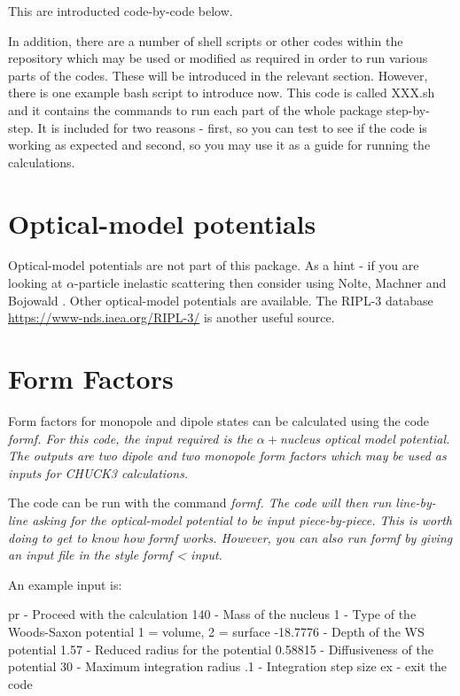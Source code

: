 \documentclass[a4paper,10pt]{article}
\begin{document}
This are introducted code-by-code below.

In addition, there are a number of shell scripts or other codes within the repository which may be used or modified as required in order to run various parts of the codes. These will be introduced in the relevant section. However, there is one example bash script to introduce now. This code is called XXX.sh and it contains the commands to run each part of the whole package step-by-step. It is included for two reasons - first, so you can test to see if the code is working as expected and second, so you may use it as a guide for running the calculations.

\section{Optical-model potentials}

Optical-model potentials are not part of this package. As a hint - if you are looking at $\alpha$-particle inelastic scattering then consider using Nolte, Machner and Bojowald \cite{NMBAlphaPotentials}. Other optical-model potentials are available. The RIPL-3 database \url{https://www-nds.iaea.org/RIPL-3/} is another useful source.

\section{Form Factors}

Form factors for monopole and dipole states can be calculated using the code \it{formf}. For this code, the input required is the $\alpha+$nucleus optical model potential. The outputs are two dipole and two monopole form factors which may be used as inputs for CHUCK3 calculations.

The code can be run with the command \it{formf}. The code will then run line-by-line asking for the optical-model potential to be input piece-by-piece. This is worth doing to get to know how \it{formf} works. However, you can also run \it{formf} by giving an input file in the style \it{formf < input}.

An example input is:

pr - Proceed with the calculation
140 - Mass of the nucleus
1 - Type of the Woods-Saxon potential 1 = volume, 2 = surface
-18.7776 - Depth of the WS potential
1.57 - Reduced radius for the potential
0.58815 - Diffusiveness of the potential
30 - Maximum integration radius
.1 - Integration step size
ex - exit the code
\end{document}
